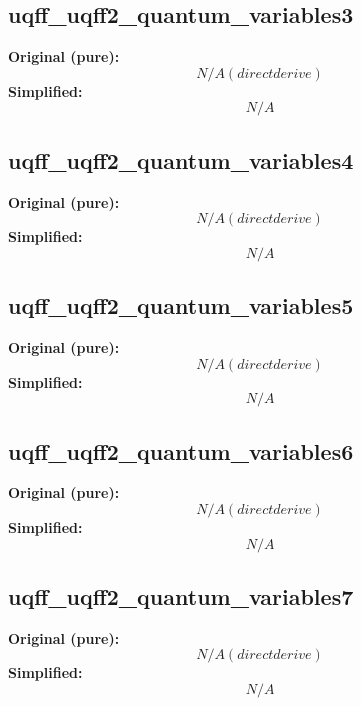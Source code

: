 \subsection{uqff_uqff2_quantum_variables3}
\textbf{Original (pure):}
\begin{equation}
N/A (direct derive)
\end{equation}
\textbf{Simplified:}
\begin{equation}
N/A
\end{equation}

\subsection{uqff_uqff2_quantum_variables4}
\textbf{Original (pure):}
\begin{equation}
N/A (direct derive)
\end{equation}
\textbf{Simplified:}
\begin{equation}
N/A
\end{equation}

\subsection{uqff_uqff2_quantum_variables5}
\textbf{Original (pure):}
\begin{equation}
N/A (direct derive)
\end{equation}
\textbf{Simplified:}
\begin{equation}
N/A
\end{equation}

\subsection{uqff_uqff2_quantum_variables6}
\textbf{Original (pure):}
\begin{equation}
N/A (direct derive)
\end{equation}
\textbf{Simplified:}
\begin{equation}
N/A
\end{equation}

\subsection{uqff_uqff2_quantum_variables7}
\textbf{Original (pure):}
\begin{equation}
N/A (direct derive)
\end{equation}
\textbf{Simplified:}
\begin{equation}
N/A
\end{equation}

